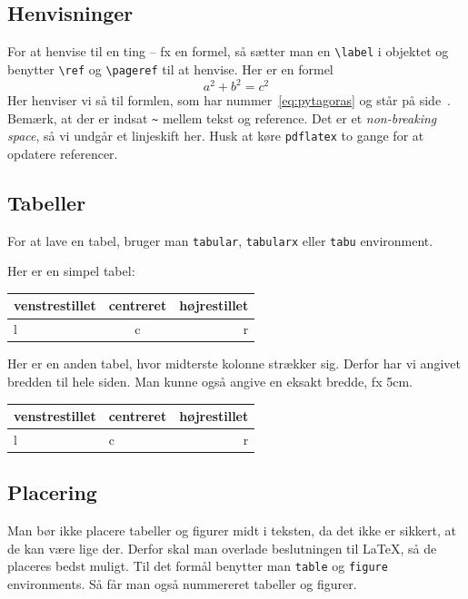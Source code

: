 \documentclass[a4,12pt]{article}
\numberwithin{equation}{section}
\numberwithin{table}{section}
\numberwithin{figure}{section}
\begin{document}
\subsection{Henvisninger}
For at henvise til en ting -- fx en formel, så sætter man en \verb$\label$ i objektet og benytter \verb$\ref$ og \verb$\pageref$ til at henvise. Her er en formel
\begin{equation}
  a^2 + b^2 = c^2
  \label{eq:pytagoras}
\end{equation}
Her henviser vi så til formlen, som har nummer~\ref{eq:pytagoras} og står på side~\pageref{eq:pytagoras}. Bemærk, at der er indsat \verb$~$ mellem tekst og reference. Det er et \emph{non-breaking space}, så vi undgår et linjeskift her. Husk at køre \verb$pdflatex$ to gange for at opdatere referencer.

\subsection{Tabeller}
For at lave en tabel, bruger man \verb$tabular$, \verb$tabularx$ eller \verb$tabu$ environment.

Her er en simpel tabel:

\begin{tabu}{|l|c|r|}
  \hline %
  \rowfont{\bfseries} %
  venstrestillet & centreret & højrestillet \\ %
  \hline %
  l & c & r \\
  \hline %
\end{tabu}

Her er en anden tabel, hvor midterste kolonne strækker sig. Derfor har vi angivet bredden til hele siden. Man kunne også angive en eksakt bredde, fx 5cm.

\begin{tabu} to \textwidth {|l|X[c]|r|}
  \hline %
  \rowfont{\bfseries} %
  venstrestillet & centreret & højrestillet \\
  \hline %
  l & c & r \\
  \hline %
\end{tabu}

\subsection{Placering}
Man bør ikke placere tabeller og figurer midt i teksten, da det ikke er sikkert, at de kan være lige der. Derfor skal man overlade beslutningen til \LaTeX, så de placeres bedst muligt. Til det formål benytter man \verb$table$ og \verb$figure$ environments. Så får man også nummereret tabeller og figurer.
\end{document}
